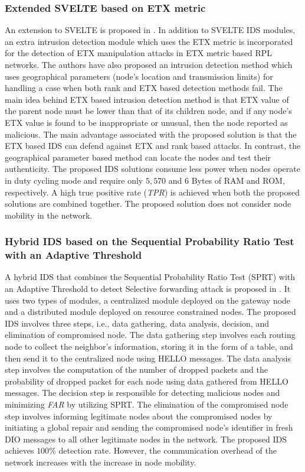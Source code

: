 \documentclass[10pt,journal,sort & compress]{IEEEtran}
\begin{document}
\subsubsection*{Extended SVELTE based on ETX metric}
An extension to SVELTE is proposed in \cite{Shreenivas2017}. In addition to SVELTE IDS modules, an extra intrusion detection module which uses the ETX metric is incorporated for the detection of ETX manipulation attacks in ETX metric based RPL networks. The authors have also proposed an intrusion detection method which uses geographical parameters (node's location and transmission limits) for handling a case when both rank and ETX based detection methods fail. The main idea behind ETX based intrusion detection method is that ETX value of the parent node must be lower than that of its children node, and if any node's ETX value is found to be inappropriate or unusual, then the node reported as malicious. The main advantage associated with the proposed solution is that the ETX based IDS can defend against ETX and rank based attacks. In contrast, the geographical parameter based method can locate the nodes and test their authenticity. The proposed IDS solutions consume less power when nodes operate in duty cycling mode and require only $ 5,570 $ and $ 6 $ Bytes of RAM and ROM, respectively. A high true positive rate (\textit{TPR}) is achieved when both the proposed solutions are combined together. The proposed solution does not consider node mobility in the network. 


\subsubsection*{Hybrid IDS based on the Sequential Probability Ratio Test with an Adaptive Threshold}
A hybrid IDS that combines the Sequential Probability Ratio Test (SPRT) with an Adaptive Threshold to detect Selective forwarding attack is proposed in \cite{gara2017intrusion}. It uses two types of modules, a centralized module deployed on the gateway node and a distributed module deployed on resource constrained nodes. The proposed IDS involves three steps, i.e., data gathering, data analysis, decision, and elimination of compromised node. The data gathering step involves each routing node to collect the neighbor's information, storing it in the form of a table, and then send it to the centralized node using HELLO messages. The data analysis step involves the computation of the number of dropped packets and the probability of dropped packet for each node using data gathered from HELLO messages. The decision step is responsible for detecting malicious nodes and minimizing \textit{FAR} by utilizing SPRT. The elimination of the compromised node step involves informing legitimate nodes about the compromised nodes by initiating a global repair and sending the compromised node's identifier in fresh DIO messages to all other legitimate nodes in the network.       
The proposed IDS achieves $ 100\% $ detection rate. However, the communication overhead of the network increases with the increase in node mobility. 
\end{document}
